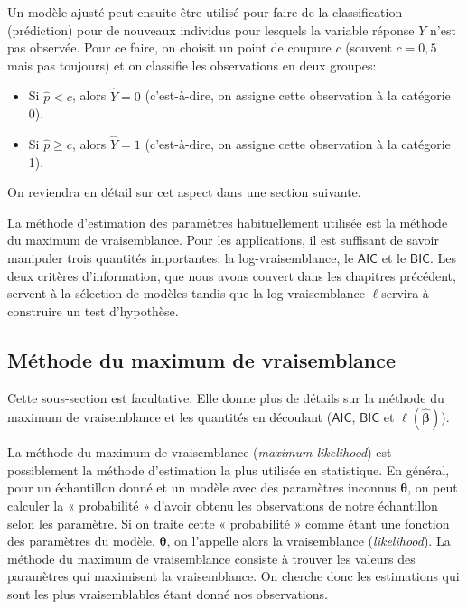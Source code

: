 \documentclass[
  11pt,
  letterpaper,
]{book}
\providecommand{\tightlist}{%
  \setlength{\itemsep}{0pt}\setlength{\parskip}{0pt}}
\theoremstyle{definition}
\theoremstyle{definition}
\theoremstyle{definition}
\theoremstyle{remark}
\begin{document}
Un modèle ajusté peut ensuite être utilisé pour faire de la classification (prédiction) pour de nouveaux individus pour lesquels la variable réponse \(Y\) n'est pas observée. Pour ce faire, on choisit un point de coupure \(c\) (souvent \(c=0,5\) mais pas toujours) et on classifie les observations en deux groupes:

\begin{itemize}
\tightlist
\item
  Si \(\widehat{p}< c\), alors \(\widehat{Y}=0\) (c'est-à-dire, on assigne cette observation à la catégorie 0).
\item
  Si \(\widehat{p} \geq c\), alors \(\widehat{Y}=1\) (c'est-à-dire, on assigne cette observation à la catégorie 1).
\end{itemize}

On reviendra en détail sur cet aspect dans une section suivante.

La méthode d'estimation des paramètres habituellement utilisée est la méthode du maximum de vraisemblance. Pour les applications, il est suffisant de savoir manipuler trois quantités importantes: la log-vraisemblance, le \(\mathsf{AIC}\) et le \(\mathsf{BIC}\). Les deux critères d'information, que nous avons couvert dans les chapitres précédent, servent à la sélection de modèles tandis que la log-vraisemblance \(\ell\)servira à construire un test d'hypothèse.

\hypertarget{muxe9thode-du-maximum-de-vraisemblance}{%
\subsection{Méthode du maximum de vraisemblance}\label{muxe9thode-du-maximum-de-vraisemblance}}

Cette sous-section est facultative. Elle donne plus de détails sur la méthode du maximum de vraisemblance et les quantités en découlant (\(\mathsf{AIC}\), \(\mathsf{BIC}\) et \(\ell(\widehat{\boldsymbol{\beta}})\)).

La méthode du maximum de vraisemblance (\emph{maximum likelihood}) est possiblement la méthode d'estimation la plus utilisée en statistique. En général, pour un échantillon donné et un modèle avec des paramètres inconnus \(\boldsymbol{\theta}\), on peut calculer la « probabilité » d'avoir obtenu les observations de notre échantillon selon les paramètre. Si on traite cette « probabilité » comme étant une fonction des paramètres du modèle, \(\boldsymbol{\theta}\), on l'appelle alors la vraisemblance (\emph{likelihood}). La méthode du maximum de vraisemblance consiste à trouver les valeurs des paramètres qui maximisent la vraisemblance. On cherche donc les estimations qui sont les plus vraisemblables étant donné nos observations.
\end{document}

